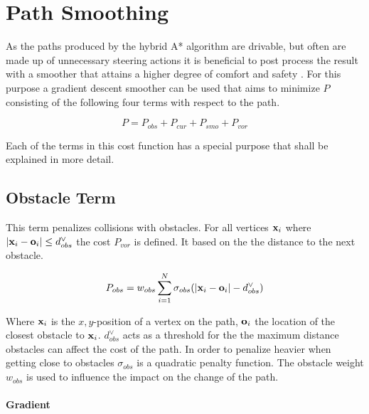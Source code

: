 \section{Path Smoothing}
As the paths produced by the hybrid A* algorithm are drivable, but often are made up of unnecessary steering actions it is beneficial to post process the result with a smoother that attains a higher degree of comfort and safety \cite{Dolgov.2008,Dolgov.2010}. For this purpose a gradient descent smoother can be used that aims to minimize $P$ consisting of the following four terms with respect to the path.

\begin{equation}
P = P_{obs} + P_{cur} + P_{smo} + P_{vor}
\end{equation}

Each of the terms in this cost function has a special purpose that shall be explained in more detail.

\subsection{Obstacle Term}

This term penalizes collisions with obstacles. For all vertices $\mathbf{x}_i$ where $|\mathbf{x}_i - \mathbf{o}_i| \leq d_{obs}^{\lor}$ the cost $P_{vor}$ is defined. It based on the the distance to the next obstacle.


\begin{equation}
P_{obs} = w_{obs} \displaystyle\sum_{i=1}^{N} \sigma_{obs}(|\mathbf{x}_i-\mathbf{o}_i|-d_{obs}^{\lor})
\end{equation}

Where $\mathbf{x}_i$ is the $x,y$-position of a vertex on the path, $\mathbf{o}_i$ the location of the closest obstacle to $\mathbf{x}_i$. $d_{obs}^{\lor}$ acts as a threshold for the the maximum distance obstacles can affect the cost of the path. In order to penalize heavier when getting close to obstacles $\sigma_{obs}$ is a quadratic penalty function. The obstacle weight $w_{obs}$ is used to influence the impact on the change of the path.

\paragraph{Gradient}

